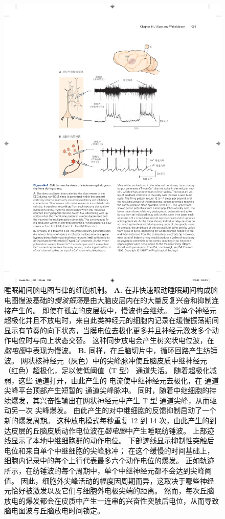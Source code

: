 \begin{figure}[htbp]
	\centering
	\includegraphics[width=0.9\linewidth]{chap44/fig_44_2}
	\caption{睡眠期间脑电图节律的细胞机制。
		\textbf{A.} 在非快速眼动睡眠期间构成脑电图慢波基础的\textit{慢波振荡}是由大脑皮层内在的大量反复兴奋和抑制连接产生的。
		即使在孤立的皮层板中，慢波也会继续。
		当单个神经元超极化并且不放电时，来自此类神经元的细胞内记录在缓慢振荡期间显示有节奏的向下状态，当膜电位去极化更多并且神经元激发多个动作电位时与向上状态交替。
		这种同步放电会产生树突状电位波，在\textit{脑电图}中表现为慢波。
		\textbf{B.} 同样，在丘脑切片中，循环回路产生纺锤波。
		网状核神经元（灰色）中的尖峰脉冲使丘脑皮质中继神经元（红色）超极化，足以使低阈值（T 型） 通道失活。
		随着超极化减弱，这些  通道打开，由此产生的  电流使中继神经元去极化，在  通道尖峰平台顶部产生短暂的  通道尖峰脉冲。
		同时，随着中继细胞的持续爆发，其兴奋性输出在网状神经元中产生 T 型  通道尖峰，从而驱动另一次  尖峰爆发。
		由此产生的对中继细胞的反馈抑制启动了一个新的爆发周期。
		这种放电模式每秒重复 12 到 14 次，由此产生的到达皮层的丘脑皮质动作电位波在\textit{脑电图}中产生睡眠纺锤波。
		上部迹线显示了本地中继细胞群的动作电位。
		下部迹线显示抑制性突触后电位和来自单个中继细胞的尖峰脉冲； 在这个缓慢的时间基础上，细胞内记录中的每个上行代表最多六个动作电位的爆发。
		正如轨迹所示，在纺锤波的每个周期中，单个中继神经元都不会达到尖峰阈值。
		因此，细胞外尖峰活动的幅度因周期而异，这取决于哪些神经元恰好被激发以及它们与细胞外电极尖端的距离。
		然而，每次丘脑放电的爆发都会在皮质中产生一连串的兴奋性突触后电位，从而导致脑电图波与丘脑放电时间锁定\cite{bal1995synaptic}。}
	\label{fig:44_2}
\end{figure}



